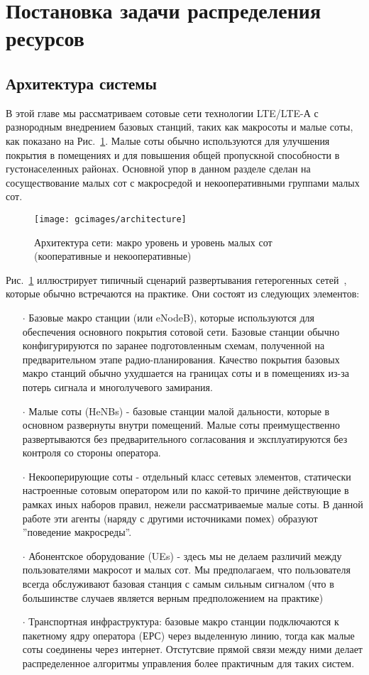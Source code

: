 \section{Постановка задачи распределения ресурсов}
\subsection{Архитектура системы}
В этой главе мы рассматриваем сотовые сети технологии LTE/LTE-А с разнородным внедрением базовых станций, таких как макросоты и малые соты, как показано на Рис.~\ref{fig:architecture}. Малые соты обычно используются для улучшения покрытия в помещениях и для повышения общей пропускной способности в густонаселенных районах. Основной упор в данном разделе сделан на сосуществование малых сот с макросредой и некооперативными группами малых сот.

\begin{figure}
    \centering
    \texttt{[image: gcimages/architecture]}
    \caption{Архитектура сети: макро уровень и уровень малых сот (кооперативные и некооперативные)}
    \label{fig:architecture}
\end{figure}

Рис.~\ref{fig:architecture} иллюстрирует типичный сценарий развертывания гетерогенных сетей~\cite{6824744}, которые обычно встречаются на практике. Они состоят из следующих элементов:

\begin{itemize}
\item[$\cdot$] Базовые макро станции (или eNodeB), которые используются для обеспечения основного покрытия сотовой сети. Базовые станции обычно конфигурируются по заранее подготовленным схемам, полученной на предварительном этапе радио-планирования. Качество покрытия базовых макро станций обычно ухудшается на границах соты и в помещениях из-за потерь сигнала и многолучевого замирания. 
\item[$\cdot$] Малые соты (HeNBs) - базовые станции малой дальности, которые в основном развернуты внутри помещений. Малые соты преимущественно развертываются без предварительного согласования и эксплуатируются без контроля со стороны оператора.
\item[$\cdot$] Некооперирующие соты - отдельный класс сетевых элементов, статически настроенные сотовым оператором или по какой-то причине действующие в рамках иных наборов правил, нежели рассматриваемые малые соты. В данной работе эти агенты (наряду с другими источниками помех) образуют ''поведение макросреды''.
\item[$\cdot$] Абонентское оборудование (UEs) - здесь мы не делаем различий между пользователями макросот и малых сот. Мы предполагаем, что пользователя всегда обслуживают базовая станция с самым сильным сигналом (что в большинстве случаев является верным предположением на практике)
\item[$\cdot$] Транспортная инфраструктура: базовые макро станции подключаются к пакетному ядру оператора (ЕРС) через выделенную линию, тогда как малые соты соединены через интернет. Отстутсвие прямой связи между ними делает распределенное алгоритмы управления более практичным для таких систем.
\end{itemize}

